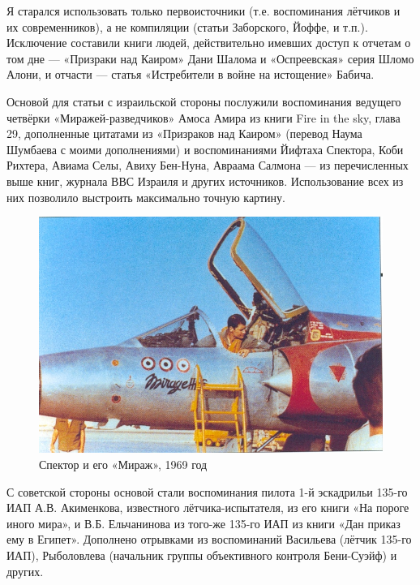 Я старался использовать только первоисточники (т.е. воспоминания лётчиков и их современников), а не компиляции (статьи Заборского, Йоффе, и т.п.). Исключение составили книги людей, действительно имевших доступ к отчетам о том дне — «Призраки над Каиром» Дани Шалома и «Оспреевская» серия Шломо Алони, и отчасти — статья «Истребители в войне на истощение» Бабича.

Основой для статьи с израильской стороны послужили воспоминания ведущего четвёрки «Миражей-разведчиков» Амоса Амира из книги Fire in the sky, глава 29, дополненные цитатами из «Призраков над Каиром» (перевод Наума Шумбаева с моими дополнениями) и воспоминаниями Йифтаха Спектора, Коби Рихтера, Авиама Селы, Авиху Бен-Нуна, Авраама Салмона — из перечисленных выше книг, журнала ВВС Израиля и других источников. Использование всех из них позволило выстроить максимально точную картину.

\begin{figure}[h!tb] 
	\centering\includegraphics[scale=0.4]{Dolina_4/Avbi2GYLra4.jpg}
	\caption{Спектор и его «Мираж», 1969 год}%
\end{figure}

С советской стороны основой стали воспоминания пилота 1-й эскадрильи 135-го ИАП А.В. Акименкова, известного лётчика-испытателя, из его книги «На пороге иного мира», и В.Б. Ельчанинова из того-же 135-го ИАП из книги «Дан приказ ему в Египет». Дополнено отрывками из воспоминаний Васильева (лётчик 135-го ИАП), Рыболовлева (начальник группы объективного контроля Бени-Суэйф) и других.

